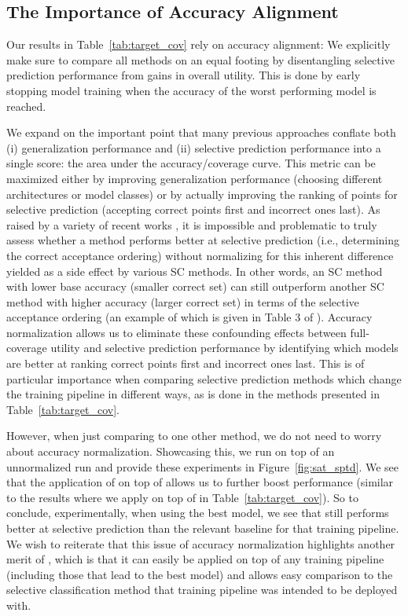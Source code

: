 \subsection{The Importance of Accuracy Alignment}

Our results in Table~\ref{tab:target_cov} rely on accuracy alignment: We explicitly make sure to compare all methods on an equal footing by disentangling selective prediction performance from gains in overall utility. This is done by early stopping model training when the accuracy of the worst performing model is reached.

We expand on the important point that many previous approaches conflate both (i) generalization performance and (ii) selective prediction performance into a single score: the area under the accuracy/coverage curve. This metric can be maximized either by improving generalization performance (choosing different architectures or model classes) or by actually improving the ranking of points for selective prediction (accepting correct points first and incorrect ones last). As raised by a variety of recent works \cite{geifman2018bias, rabanser2023training, cattelan2023improving}, it is impossible and problematic to truly assess whether a method performs better at selective prediction (i.e., determining the correct acceptance ordering) without normalizing for this inherent difference yielded as a side effect by various SC methods. In other words, an SC method with lower base accuracy (smaller correct set) can still outperform another SC method with higher accuracy (larger correct set) in terms of the selective acceptance ordering (an example of which is given in Table 3 of \cite{liu2019deep}). Accuracy normalization allows us to eliminate these confounding effects between full-coverage utility and selective prediction performance by identifying which models are better at ranking correct points first and incorrect ones last. This is of particular importance when comparing selective prediction methods which change the training pipeline in different ways, as is done in the methods presented in Table~\ref{tab:target_cov}.

However, when just comparing \sptd to one other method, we do not need to worry about accuracy normalization. Showcasing this, we run \sptd on top of an unnormalized \satersr run and provide these experiments in Figure~\ref{fig:sat_sptd}. We see that the application of \sptd on top of \satersr allows us to further boost performance (similar to the results where we apply \sptd on top of \de in Table~\ref{tab:target_cov}). So to conclude, experimentally, when using the best model, we see that \sptd still performs better at selective prediction than the relevant baseline for that training pipeline. We wish to reiterate that this issue of accuracy normalization highlights another merit of \sptd, which is that it can easily be applied on top of any training pipeline (including those that lead to the best model) and allows easy comparison to the selective classification method that training pipeline was intended to be deployed with.

